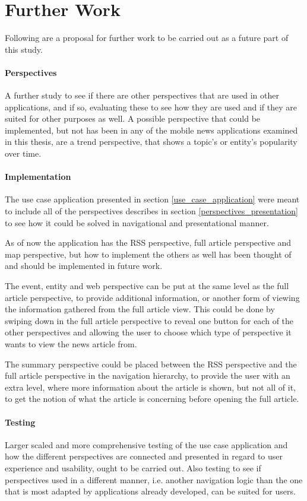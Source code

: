 \chapter{Further Work}
\label{further_work}

Following are a proposal for further work to be carried out as a future part of this study.

\subsubsection{Perspectives}
A further study to see if there are other perspectives that are used in other applications, and if so, evaluating these to see how they are used and if they are suited for other purposes as well. A possible perspective that could be implemented, but not has been in any of the mobile news applications examined in this thesis, are a trend perspective, that shows a topic's or entity's popularity over time.


\subsubsection{Implementation}
The use case application presented in section \ref{use_case_application} were meant to include all of the perspectives describes in section \ref{perspectives_presentation} to see how it could be solved in navigational and presentational manner. 

As of now the application has the RSS perspective, full article perspective and map perspective, but how to implement the others as well has been thought of and should be implemented in future work. 

The event, entity and web perspective can be put at the same level as the full article perspective, to provide additional information, or another form of viewing the information gathered from the full article view. This could be done by swiping down in the full article perspective to reveal one button for each of the other perspectives and allowing the user to choose which type of perspective it wants to view the news article from.

The summary perspective could be placed between the RSS perspective and the full article perspective in the navigation hierarchy, to provide the user with an extra level, where more information about the article is shown, but not all of it, to get the notion of what the article is concerning before opening the full article.

\subsubsection{Testing}
Larger scaled and more comprehensive testing of the use case application and how the different perspectives are connected and presented in regard to user experience and usability, ought to be carried out. Also testing to see if perspectives used in a different manner, i.e. another navigation logic than the one that is most adapted by applications already developed, can be suited for users.


